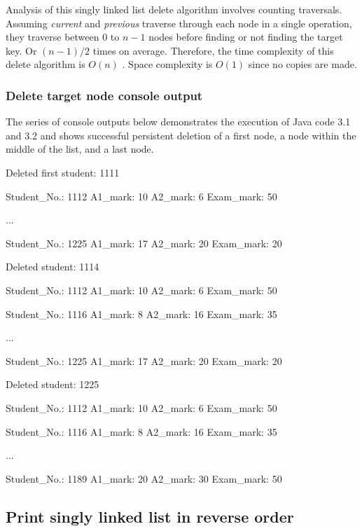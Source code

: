 Analysis of this singly linked list delete algorithm involves counting traversals. Assuming \emph{current} and \emph{previous} traverse through each node in a single operation, they traverse between 0 to $n - 1$ nodes before finding or not finding the target key. Or $(n - 1) / 2$ times on average. Therefore, the time complexity of this delete algorithm is $O(n)$ \citep[p. 83]{Watt2001}. Space complexity is $O(1)$ since no copies are made.

\newpage
\subsubsection{Delete target node console output}

The series of console outputs below demonstrates the execution of Java code 3.1 and 3.2 and shows successful persistent deletion of a first node, a node within the middle of the list, and a last node.
\\
\begin{consolecode}
Deleted first student: 1111

Student_No.: 1112
A1_mark: 10
A2_mark: 6
Exam_mark: 50

...

Student_No.: 1225
A1_mark: 17
A2_mark: 20
Exam_mark: 20
\end{consolecode}

\begin{consolecode}
Deleted student: 1114

Student_No.: 1112
A1_mark: 10
A2_mark: 6
Exam_mark: 50

Student_No.: 1116
A1_mark: 8
A2_mark: 16
Exam_mark: 35

...

Student_No.: 1225
A1_mark: 17
A2_mark: 20
Exam_mark: 20
\end{consolecode}

\begin{consolecode}
Deleted student: 1225

Student_No.: 1112
A1_mark: 10
A2_mark: 6
Exam_mark: 50

Student_No.: 1116
A1_mark: 8
A2_mark: 16
Exam_mark: 35

...

Student_No.: 1189
A1_mark: 20
A2_mark: 30
Exam_mark: 50
\end{consolecode}

\newpage
\subsection{Print singly linked list in reverse order}

